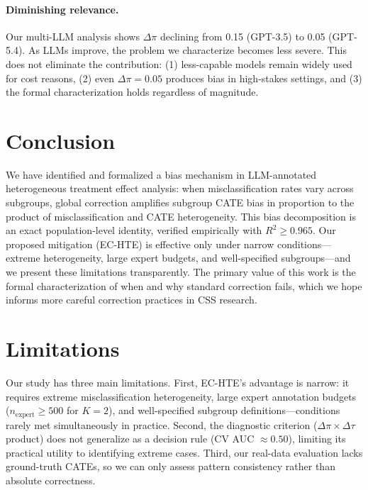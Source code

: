 \documentclass[11pt]{article}
\begin{document}
\paragraph{Diminishing relevance.}
Our multi-LLM analysis shows $\Delta\pi$ declining from 0.15 (GPT-3.5) to 0.05 (GPT-5.4).
As LLMs improve, the problem we characterize becomes less severe.
This does not eliminate the contribution: (1) less-capable models remain widely used for cost reasons, (2) even $\Delta\pi = 0.05$ produces bias in high-stakes settings, and (3) the formal characterization holds regardless of magnitude.

\section{Conclusion}
\label{sec:conclusion}

We have identified and formalized a bias mechanism in LLM-annotated heterogeneous treatment effect analysis: when misclassification rates vary across subgroups, global correction amplifies subgroup CATE bias in proportion to the product of misclassification and CATE heterogeneity.
This bias decomposition is an exact population-level identity, verified empirically with $R^2 \geq 0.965$.
Our proposed mitigation (EC-HTE) is effective only under narrow conditions---extreme heterogeneity, large expert budgets, and well-specified subgroups---and we present these limitations transparently.
The primary value of this work is the formal characterization of when and why standard correction fails, which we hope informs more careful correction practices in CSS research.

\section*{Limitations}

Our study has three main limitations.
First, EC-HTE's advantage is narrow: it requires extreme misclassification heterogeneity, large expert annotation budgets ($n_{\text{expert}} \geq 500$ for $K{=}2$), and well-specified subgroup definitions---conditions rarely met simultaneously in practice.
Second, the diagnostic criterion ($\Delta\pi \times \Delta\tau$ product) does not generalize as a decision rule (CV AUC $\approx 0.50$), limiting its practical utility to identifying extreme cases.
Third, our real-data evaluation lacks ground-truth CATEs, so we can only assess pattern consistency rather than absolute correctness.
\end{document}
